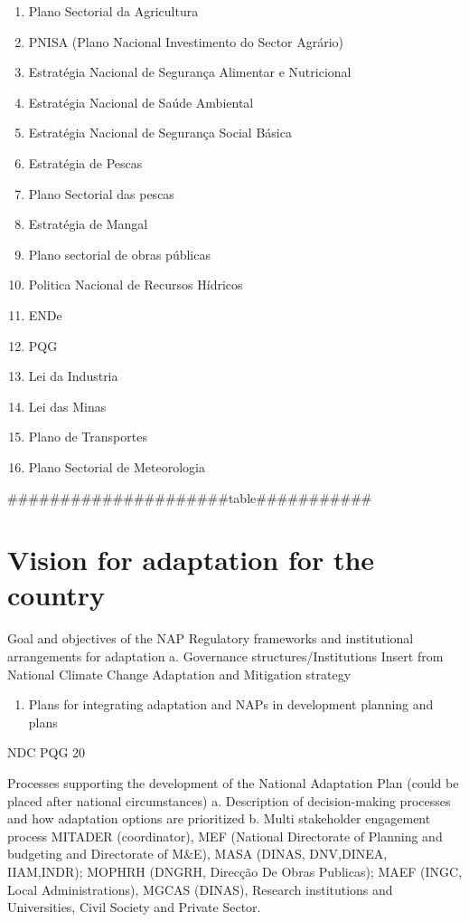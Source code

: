 \documentclass[
]{book}
\providecommand{\tightlist}{%
  \setlength{\itemsep}{0pt}\setlength{\parskip}{0pt}}
\begin{document}
\begin{enumerate}
\item
  Plano Sectorial da Agricultura
\item
  PNISA (Plano Nacional Investimento do Sector Agrário)
\item
  Estratégia Nacional de Segurança Alimentar e Nutricional
\item
  Estratégia Nacional de Saúde Ambiental
\item
  Estratégia Nacional de Segurança Social Básica
\item
  Estratégia de Pescas
\item
  Plano Sectorial das pescas
\item
  Estratégia de Mangal
\item
  Plano sectorial de obras públicas
\item
  Politica Nacional de Recursos Hídricos
\item
  ENDe
\item
  PQG
\item
  Lei da Industria
\item
  Lei das Minas
\item
  Plano de Transportes
\item
  Plano Sectorial de Meteorologia
\end{enumerate}

\#\#\#\#\#\#\#\#\#\#\#\#\#\#\#\#\#\#\#\#\#table\#\#\#\#\#\#\#\#\#\#\#

\hypertarget{vision-for-adaptation-for-the-country}{%
\chapter{Vision for adaptation for the country}\label{vision-for-adaptation-for-the-country}}

Goal and objectives of the NAP
Regulatory frameworks and institutional arrangements for adaptation
a. Governance structures/Institutions
Insert from National Climate Change Adaptation and Mitigation strategy

\begin{enumerate}
\def\labelenumi{\alph{enumi}.}
\setcounter{enumi}{1}
\tightlist
\item
  Plans for integrating adaptation and NAPs in development planning and plans
\end{enumerate}

NDC
PQG 20

Processes supporting the development of the National Adaptation Plan (could be placed after national circumstances)
a. Description of decision-making processes and how adaptation options are prioritized
b. Multi stakeholder engagement process
MITADER (coordinator), MEF (National Directorate of Planning and budgeting and Directorate of M\&E), MASA (DINAS, DNV,DINEA, IIAM,INDR); MOPHRH (DNGRH, Direcção De Obras Publicas); MAEF (INGC, Local Administrations), MGCAS (DINAS), Research institutions and Universities, Civil Society and Private Sector.
\end{document}
